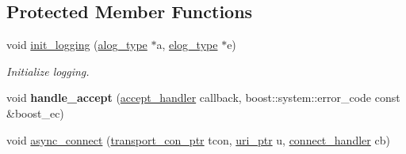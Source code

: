 \subsection*{Protected Member Functions}
\begin{DoxyCompactItemize}
\item 
void \hyperlink{classwebsocketpp_1_1transport_1_1asio_1_1endpoint_a26ad1ad26277ed99a691559e69d47932}{init\+\_\+logging} (\hyperlink{classwebsocketpp_1_1transport_1_1asio_1_1endpoint_acba708e66a47d4aae9a053d364585b81}{alog\+\_\+type} $\ast$a, \hyperlink{classwebsocketpp_1_1transport_1_1asio_1_1endpoint_a2aa93730c801602b55b585121a2898c0}{elog\+\_\+type} $\ast$e)
\begin{DoxyCompactList}\small\item\em Initialize logging. \end{DoxyCompactList}\item 
void {\bfseries handle\+\_\+accept} (\hyperlink{namespacewebsocketpp_1_1transport_a9326ea831379368ee47841b2e46cb009}{accept\+\_\+handler} callback, boost\+::system\+::error\+\_\+code const \&boost\+\_\+ec)\hypertarget{classwebsocketpp_1_1transport_1_1asio_1_1endpoint_aed00d2f44579fb735fd466b96c19a0c7}{}\label{classwebsocketpp_1_1transport_1_1asio_1_1endpoint_aed00d2f44579fb735fd466b96c19a0c7}

\item 
void \hyperlink{classwebsocketpp_1_1transport_1_1asio_1_1endpoint_a1ca12e4d72c691e6cc1ce1f5316e3243}{async\+\_\+connect} (\hyperlink{classwebsocketpp_1_1transport_1_1asio_1_1endpoint_ac5fc306f32d15f92dd1b22366eaba62d}{transport\+\_\+con\+\_\+ptr} tcon, \hyperlink{namespacewebsocketpp_aae370ea5ac83a8ece7712cb39fc23f5b}{uri\+\_\+ptr} u, \hyperlink{namespacewebsocketpp_1_1transport_ac392fca34e946b48414278c0c3addfa5}{connect\+\_\+handler} cb)\hypertarget{classwebsocketpp_1_1transport_1_1asio_1_1endpoint_a1ca12e4d72c691e6cc1ce1f5316e3243}{}\label{classwebsocketpp_1_1transport_1_1asio_1_1endpoint_a1ca12e4d72c691e6cc1ce1f5316e3243}


\end{DoxyCompactItemize}
